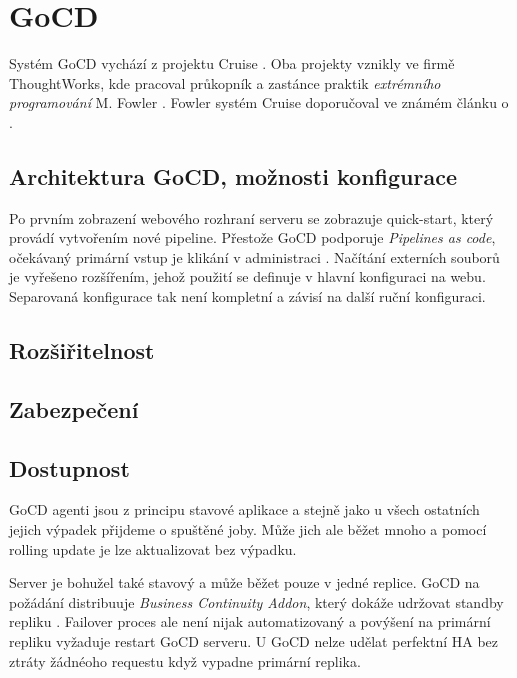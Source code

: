 \section{GoCD}
    Systém GoCD vychází z projektu Cruise \cite{thoughtworks-gocd}. Oba projekty vznikly ve firmě ThoughtWorks, kde pracoval průkopník a zastánce praktik \textit{extrémního programování} M. Fowler \cite{fowler-go}. Fowler systém Cruise doporučoval ve známém článku o \CI \cite{fowler-ci}.

    \subsection{Architektura GoCD, možnosti konfigurace}
        \blind[1]

        Po prvním zobrazení webového rozhraní serveru se zobrazuje quick-start, který provádí vytvořením nové pipeline. Přestože GoCD podporuje \textit{Pipelines as code}, očekávaný primární vstup je klikání v administraci \cite{gocd-pas}. Načítání externích souborů je vyřešeno rozšířením, jehož použití se definuje v hlavní  konfiguraci na webu. Separovaná konfigurace tak není kompletní a závisí na další ruční konfiguraci.

        \blind[1]
        \blind[1]

    \subsection{Rozšiřitelnost}
        \blind[3]

    \subsection{Zabezpečení}
        \blind[3]

    \subsection{Dostupnost}
        GoCD agenti jsou z principu stavové aplikace a stejně jako u všech ostatních \CI jejich výpadek přijdeme o spuštěné joby. Může jich ale běžet mnoho a pomocí rolling update je lze aktualizovat bez výpadku.

        Server je bohužel také stavový a může běžet pouze v jedné replice. GoCD na požádání distribuuje \textit{Business Continuity Addon}, který dokáže udržovat standby repliku \cite{gocd-ha}. Failover proces ale není nijak automatizovaný a povýšení na primární repliku vyžaduje restart GoCD serveru. U GoCD nelze udělat perfektní HA bez ztráty žádnéoho requestu když vypadne primární replika.

